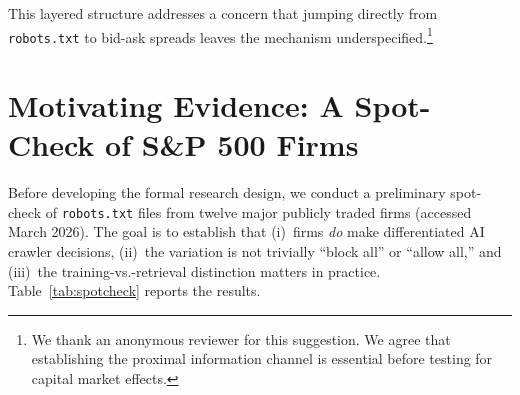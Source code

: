 \documentclass[12pt,a4paper]{article}
\begin{document}
This layered structure addresses a concern that jumping directly from \texttt{robots.txt} to bid-ask spreads leaves the mechanism underspecified.\footnote{We thank an anonymous reviewer for this suggestion. We agree that establishing the proximal information channel is essential before testing for capital market effects.}

\section{Motivating Evidence: A Spot-Check of S\&P 500 Firms}
\label{sec:spotcheck}

Before developing the formal research design, we conduct a preliminary spot-check of \texttt{robots.txt} files from twelve major publicly traded firms (accessed March 2026). The goal is to establish that (i)~firms \emph{do} make differentiated AI crawler decisions, (ii)~the variation is not trivially ``block all'' or ``allow all,'' and (iii)~the training-vs.-retrieval distinction matters in practice. Table~\ref{tab:spotcheck} reports the results.
\end{document}

